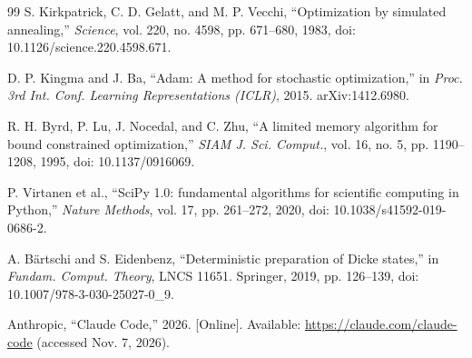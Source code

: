 \documentclass[journal]{IEEEtran}
\begin{document}
\begin{thebibliography}{99}
 S. Kirkpatrick, C. D. Gelatt, and M. P. Vecchi, ``Optimization by simulated annealing,'' \textit{Science}, vol. 220, no. 4598, pp. 671--680, 1983, doi: 10.1126/science.220.4598.671.

 D. P. Kingma and J. Ba, ``Adam: A method for stochastic optimization,'' in \textit{Proc. 3rd Int. Conf. Learning Representations (ICLR)}, 2015. arXiv:1412.6980.

 R. H. Byrd, P. Lu, J. Nocedal, and C. Zhu, ``A limited memory algorithm for bound constrained optimization,'' \textit{SIAM J. Sci. Comput.}, vol. 16, no. 5, pp. 1190--1208, 1995, doi: 10.1137/0916069.

 P. Virtanen et al., ``SciPy 1.0: fundamental algorithms for scientific computing in Python,'' \textit{Nature Methods}, vol. 17, pp. 261--272, 2020, doi: 10.1038/s41592-019-0686-2.

 A. B\"{a}rtschi and S. Eidenbenz, ``Deterministic preparation of Dicke states,'' in \textit{Fundam. Comput. Theory}, LNCS 11651. Springer, 2019, pp. 126--139, doi: 10.1007/978-3-030-25027-0\_9.

 Anthropic, ``Claude Code,'' 2026. [Online]. Available: {\url{https://claude.com/claude-code}} (accessed Nov. 7, 2026).



\end{thebibliography}
\end{document}
